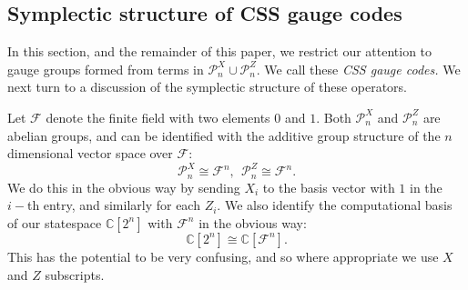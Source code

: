\documentclass[11pt,oneside]{article}
\def\Complex{\mathbb{C}}
\def\Z{\mathbb{Z}}
\def\Pauli{\mathcal{P}}
\newcommand{\Field}{\mathcal{F}}
\def\Fn{\Field^n}
\begin{document}
%
%

%
\subsection{Symplectic structure of CSS gauge codes}


In this section, and the remainder of this paper,
we restrict our
attention to gauge groups formed from terms 
in $\Pauli_n^X\cup\Pauli_n^Z.$
We call these \emph{CSS gauge codes.}
We next turn to a discussion of the symplectic structure of
these operators.

Let $\Field$ denote the finite field with two elements $0$ and $1$.
Both $\Pauli^X_n$ and $\Pauli^Z_n$ are abelian groups,
and can be identified with the additive 
group structure of the $n$ dimensional vector space
over $\Field:$
$$
    \Pauli^X_n \cong \Fn,  \ \ 
    \Pauli^Z_n \cong \Fn. 
$$
We do this in the obvious way by sending $X_i$ to the basis vector with
$1$ in the $i-$th entry, and similarly for each $Z_i$. 
We also identify the computational basis of our statespace $\Complex[2^n]$
with $\Fn$ in the obvious way:
$$
\Complex[2^n] \cong \Complex[\Fn].
$$
This has the potential to be very confusing, and
so where appropriate we use $X$ and $Z$ subscripts.
\end{document}
